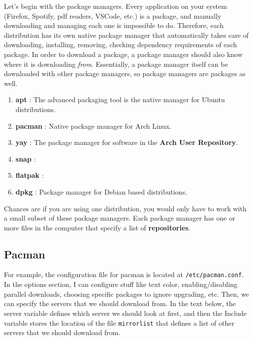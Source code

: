 \documentclass{article}
\theoremstyle{definition}
\begin{document}
  Let's begin with the package managers. Every application on your system (Firefox, Spotify, pdf readers, VSCode, etc.) is a package, and manually downloading and managing each one is impossible to do. Therefore, each distribution has its own native package manager that automatically takes care of downloading, installing, removing, checking dependency requirements of each package. In order to download a package, a package manager should also know where it is downloading \textit{from}. Essentially, a package manager itself can be downloaded with other package managers, so package managers are packages as well. 
  
  \begin{enumerate}
    \item \textbf{apt} : The advanced packaging tool is the native manager for Ubuntu distributions. 
    \item \textbf{pacman} : Native package manager for Arch Linux. 
    \item \textbf{yay} : The package manager for software in the \textbf{Arch User Repository}. 
    \item \textbf{snap} : 
    \item \textbf{flatpak} : 
    \item \textbf{dpkg} : Package manager for Debian based distributions. 
  \end{enumerate}

  Chances are if you are using one distribution, you would only have to work with a small subset of these package managers. Each package manager has one or more files in the computer that specify a list of \textbf{repositories}. 

  \subsection{Pacman}

    For example, the configuration file for pacman is located at \texttt{/etc/pacman.conf}. In the options section, I can configure stuff like text color, enabling/disabling parallel downloads, choosing specific packages to ignore upgrading, etc. Then, we can specify the servers that we should download from. In the text below, the server variable defines which server we should look at first, and then the Include variable stores the location of the file \texttt{mirrorlist} that defines a list of other servers that we should download from. 
    
\end{document}
